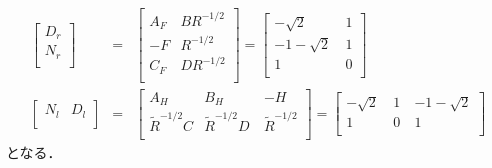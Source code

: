 \documentclass[a4paper,12pt]{jarticle}
\begin{document}
%
\begin{eqnarray}
 \left[
  \begin{array}{c}
   D_r  \\ 
   N_r   \\ 
  \end{array}
\right]
&=&
\left[
  \begin{array}{c|c}
   A_F & BR^{-1/2}  \\ \hline
  -F   & R^{-1/2}   \\
  C_F  & DR^{-1/2} \\
  \end{array}
\right]
=
\left[
  \begin{array}{c|c}
   -\sqrt{2} &~ 1  \\ \hline
  -1-\sqrt{2} &~ 1   \\
  1           &~0 \\ 
  \end{array}
\right]\\
 \left[
  \begin{array}{cc}
   N_l & D_l  \\  
  \end{array}
\right]
&=&
\left[
  \begin{array}{c|cc}
   A_H             & B_H               &-H \\ \hline
  \tilde{R}^{-1/2}C& \tilde{R}^{-1/2}D~& \tilde{R}^{-1/2} \\ 
  \end{array}
  \right]
=
\left[
  \begin{array}{c|cc}
   -\sqrt{2} &~ 1 ~&-1-\sqrt{2} \\ \hline
  1           &~ 0 ~& 1 \\ 
  \end{array}
  \right]
\end{eqnarray}
となる．
%
\end{document}
